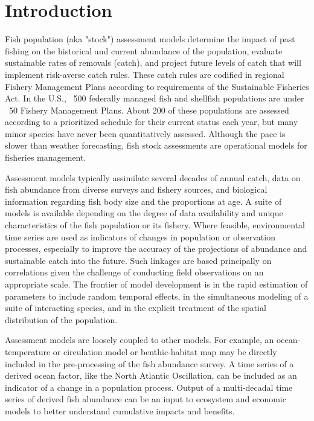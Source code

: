 
\section{Introduction}\label{sec:intro}

Fish population (aka "stock")  assessment models determine the impact of past fishing on the historical and current abundance of the population, evaluate sustainable rates of removals (catch), and project future levels of catch that will implement risk-averse catch rules.  These catch rules are codified in regional Fishery Management Plans according to requirements of the Sustainable Fisheries Act.  In the U.S., ~500 federally managed fish and shellfish populations are under ~50 Fishery Management Plans.  About 200 of these populations are assessed according to a prioritized schedule for their current status each year, but many minor species have never been quantitatively assessed.  Although the pace is slower than weather forecasting, fish stock assessments are operational models for fisheries management.

Assessment models typically assimilate several decades of annual catch, data on fish abundance from diverse surveys and fishery sources, and biological information regarding fish body size and the proportions at age.  A suite of models is available depending on the degree of data availability and unique characteristics of the fish population or its fishery.  Where feasible, environmental time series are used as indicators of changes in population or observation processes, especially to improve the accuracy of the projections of abundance and sustainable catch into the future.  Such linkages are based principally on correlations given the challenge of conducting field observations on an appropriate scale.  The frontier of model development is in the rapid estimation of parameters to include random temporal effects, in the simultaneous modeling of a suite of interacting species, and in the explicit treatment of the spatial distribution of the population.

Assessment models are loosely coupled to other models. For example, an ocean-temperature or circulation model or benthic-habitat map may be directly included in the pre-processing of the fish abundance survey.  A time series of a derived ocean factor, like the North Atlantic Oscillation, can be included as an indicator of a change in a population process.  Output of a multi-decadal time series of derived fish abundance can be an input to ecosystem and economic models to better understand cumulative impacts and benefits. 

